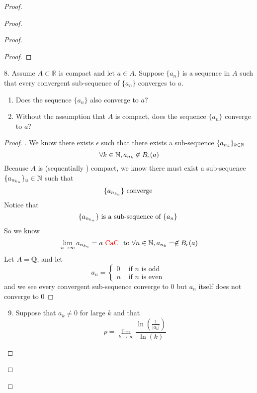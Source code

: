 \documentclass{report}
\begin{document}
\begin{proof}
\begin{proof}
\begin{proof}
\begin{proof}
\end{proof}
\begin{question}{}{}
8. Assume \( A \subset \mathbb{R} \) is compact and let \( a \in A \). Suppose \( \{ a_n \} \) is a sequence in \( A \) such that every convergent sub-sequence of \( \{ a_n \} \) converges to \( a \). 
    \begin{enumerate}
        \item Does the sequence \( \{ a_n \} \) also converge to \( a \)?
        \item Without the assumption that \( A \) is compact, does the sequence \( \{ a_n \} \) converge to \( a \)?
    \end{enumerate}
\end{question}
\begin{proof}
. We know there exists $\epsilon $ such that there exists a sub-sequence $\{ a_{n_k} \}_{k\in\mathbb{N}}$
\begin{equation}
\forall k\in\mathbb{N}, a_{n_k}\not\in B_{\epsilon }(a)
\end{equation}
Because  $A$ is (sequentially ) compact,  we know there must exist a sub-sequence $\{ a_{n_{k_u}} \}_u\in\mathbb{N}$ such that
\begin{equation}
\{ a_{n_{k_u}} \}\text{ converge }
\end{equation}
Notice that
\begin{equation}
\{ a_{n_{k_u}} \}\text{ is a sub-sequence of $\{ a_n \}$ }
\end{equation}
So we know 
 \begin{equation}
\lim_{u\to\infty}a_{n_{k_u}}=a\text{ \textcolor{red}{CaC} }\text{ to }\forall n\in\mathbb{N}, a_{n_{k}}=\not\in B_\epsilon (a)
\end{equation}
Let $A=\mathbb{Q}$, and let
 \begin{equation}
a_n=\begin{cases}
  0& \text{ if $n$ is odd }\\
  n& \text{ if $n$ is even }
\end{cases}
\end{equation}
and we see every convergent sub-sequence converge to $0$ but  $a_n$ itself does not converge to  $0$
\end{proof}
\begin{question}{}{}
\begin{enumerate}
    \setcounter{enumi}{8}
    \item Suppose that \( a_k \neq 0 \) for large \( k \) and that
    \[
    p = \lim_{{k \to \infty}} \frac{\ln\left(\frac{1}{|a_k|}\right)}{\ln(k)}
\]
\end{enumerate}
\end{question}
\end{proof}
\end{proof}
\end{proof}
\end{document}
